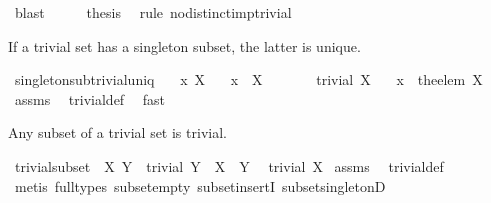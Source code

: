 \begin{isabellebody}
\ blast\isanewline
\ \ \isamarkupfalse%
\ \isamarkupfalse%
\ {\isacharquery}thesis\ \isamarkupfalse%
\ {\isacharparenleft}rule\ no{\isacharunderscore}distinct{\isacharunderscore}imp{\isacharunderscore}trivial{\isacharparenright}\isanewline
{}\isamarkupfalse%
%
\endisatagproof
{\isafoldproof}%
%
\isadelimproof
%
\endisadelimproof
%
\begin{isamarkuptext}%
If a trivial set has a singleton subset, the latter is unique.%
\end{isamarkuptext}%
\isamarkuptrue%
\isamarkupfalse%
\ singleton{\isacharunderscore}sub{\isacharunderscore}trivial{\isacharunderscore}uniq{\isacharcolon}\isanewline
\ \ \ x\ X\isanewline
\ \ \ {\isachardoublequoteopen}{\isacharbraceleft}x{\isacharbraceright}\ {\isasymsubseteq}\ X{\isachardoublequoteclose}\isanewline
\ \ \ \ \ \ \ {\isachardoublequoteopen}trivial\ X{\isachardoublequoteclose}\isanewline
\ \ \ {\isachardoublequoteopen}x\ {\isacharequal}\ the{\isacharunderscore}elem\ X{\isachardoublequoteclose}\isanewline
%
\isadelimproof
\isanewline
%
\endisadelimproof
%
\isatagproof
{}\isamarkupfalse%
\ assms\ \isamarkupfalse%
\ trivial{\isacharunderscore}def\ \isamarkupfalse%
\ fast%
\endisatagproof
{\isafoldproof}%
%
\isadelimproof
%
\endisadelimproof
%
\begin{isamarkuptext}%
Any subset of a trivial set is trivial.%
\end{isamarkuptext}%
\isamarkuptrue%
\isamarkupfalse%
\ trivial{\isacharunderscore}subset{\isacharcolon}\ \ X\ Y\ \ {\isachardoublequoteopen}trivial\ Y{\isachardoublequoteclose}\ \ {\isachardoublequoteopen}X\ {\isasymsubseteq}\ Y{\isachardoublequoteclose}\ \isanewline
{}\ {\isachardoublequoteopen}trivial\ X{\isachardoublequoteclose}\isanewline
%
\isadelimproof
\isanewline
%
\endisadelimproof
%
\isatagproof
{}\isamarkupfalse%
\ assms\ \isamarkupfalse%
\ trivial{\isacharunderscore}def\ \isamarkupfalse%
\ {\isacharparenleft}metis\ {\isacharparenleft}full{\isacharunderscore}types{\isacharparenright}\ subset{\isacharunderscore}empty\ subset{\isacharunderscore}insertI{}\ subset{\isacharunderscore}singletonD{\isacharparenright}%
\endisatagproof
{\isafoldproof}%
%
\isadelimproof
%
\endisadelimproof
%
\begin{isamarkuptext}%

\end{isamarkuptext}
\end{isabellebody}
